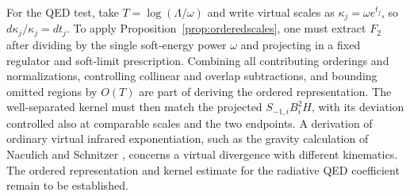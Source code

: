 For the QED test, take $T=\log(\Lambda/\omega)$ and write
virtual scales as $\kappa_j=\omega e^{t_j}$, so
$d\kappa_j/\kappa_j=dt_j$. To apply
Proposition~\ref{prop:orderedscales}, one must extract
$F_2$ after dividing by the single soft-energy power
$\omega$ and projecting in a fixed regulator and
soft-limit prescription. Combining all contributing
orderings and normalizations, controlling collinear and
overlap subtractions, and bounding omitted regions by
$O(T)$ are part of deriving the ordered representation.
The well-separated kernel must then match the projected
$S_{-1,i}B_i^2H$, with its deviation controlled also at
comparable scales and the two endpoints. A derivation of
ordinary virtual infrared exponentiation, such as the
gravity calculation of Naculich and Schnitzer
\cite{naculichschnitzer}, concerns a virtual divergence
with different kinematics. The ordered representation
and kernel estimate for the radiative QED coefficient
remain to be established.
